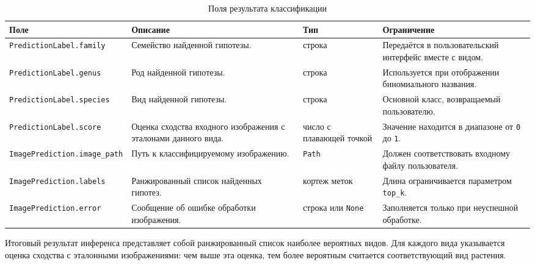 \begin{table}[!htbp]
	\centering
	\caption{Поля результата классификации}
	\label{table:prediction-fields}
	\footnotesize
	\renewcommand{\arraystretch}{1.2}
	\begin{tabularx}{\linewidth}{|p{3.8cm}|X|p{2.6cm}|p{3.6cm}|}
		\hline
		\textbf{Поле} & \textbf{Описание} & \textbf{Тип} & \textbf{Ограничение} \\
		\hline
		\texttt{PredictionLabel.}\newline\texttt{family} & Семейство найденной гипотезы. & строка & Передаётся в пользовательский интерфейс вместе с видом. \\
		\hline
		\texttt{PredictionLabel.}\newline\texttt{genus} & Род найденной гипотезы. & строка & Используется при отображении биномиального названия. \\
		\hline
		\texttt{PredictionLabel.}\newline\texttt{species} & Вид найденной гипотезы. & строка & Основной класс, возвращаемый пользователю. \\
		\hline
		\texttt{PredictionLabel.}\newline\texttt{score} & Оценка сходства входного изображения с эталонами данного вида. & число с плавающей точкой & Значение находится в диапазоне от \texttt{0} до \texttt{1}. \\
		\hline
		\texttt{ImagePrediction.}\newline\texttt{image\_path} & Путь к классифицируемому изображению. & \texttt{Path} & Должен соответствовать входному файлу пользователя. \\
		\hline
		\texttt{ImagePrediction.}\newline\texttt{labels} & Ранжированный список найденных гипотез. & кортеж меток & Длина ограничивается параметром \texttt{top\_k}. \\
		\hline
		\texttt{ImagePrediction.}\newline\texttt{error} & Сообщение об ошибке обработки изображения. & строка или \texttt{None} & Заполняется только при неуспешной обработке. \\
		\hline
	\end{tabularx}
\end{table}
\FloatBarrier

Итоговый результат инференса представляет собой ранжированный список наиболее вероятных видов. Для каждого вида указывается оценка сходства с эталонными изображениями: чем выше эта оценка, тем более вероятным считается соответствующий вид растения.

